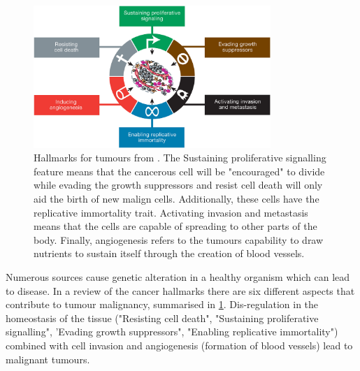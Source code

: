 \begin{figure}[!htb]
  \centering\includegraphics[width=0.8\textwidth,height=0.8\textheight,keepaspectratio]{Sections/Lit_review/Resources/tumour_causes.jpeg}
    \caption[Hallmarks of the tumours]{Hallmarks for tumours from \citep{Hanahan2011-px}. The Sustaining proliferative signalling feature means that the cancerous cell will be "encouraged" to divide while evading the growth suppressors and resist cell death will only aid the birth of new malign cells. Additionally, these cells have the replicative immortality trait. Activating invasion and metastasis means that the cells are capable of spreading to other parts of the body. Finally, angiogenesis refers to the tumours capability to draw nutrients to sustain itself through the creation of blood vessels. }
    \label{fig:hallmarks_cancer}
\end{figure}


Numerous sources cause genetic alteration in a healthy organism which can lead to disease. In a review of the cancer hallmarks \citep{Hanahan2011-px} there are six different aspects that contribute to tumour malignancy, summarised in \cref{fig:hallmarks_cancer}.  Dis-regulation in the homeostasis of the tissue ("Resisting cell death",  "Sustaining proliferative signalling", 'Evading growth suppressors", "Enabling replicative immortality") combined with cell invasion and angiogenesis (formation of blood vessels) lead to malignant tumours. 

